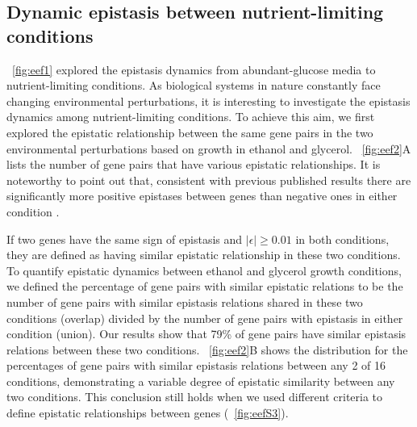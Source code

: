 \subsection{Dynamic epistasis between nutrient-limiting conditions}

\Fig~\ref{fig:eef1} explored the epistasis dynamics from abundant-glucose media
to nutrient-limiting conditions. As biological systems in nature
constantly face changing environmental perturbations, it is
interesting to investigate the epistasis dynamics among
nutrient-limiting conditions. To achieve this aim, we first explored
the epistatic relationship between the same gene pairs in the two
environmental perturbations based on growth in ethanol and
glycerol. \Fig~\ref{fig:eef2}A lists the number of gene pairs that have various
epistatic relationships. It is noteworthy to point out that,
consistent with previous published results there are significantly
more positive epistases between genes than negative ones in either
condition \citep{He2010}.


If two genes have the same sign of epistasis and
$\left|\epsilon\right| \geq 0.01$ in both conditions, they are defined
as having similar epistatic
relationship in these two conditions. To quantify epistatic dynamics
between ethanol and glycerol growth conditions, we defined the
percentage of gene pairs with similar epistatic relations to be the
number of gene pairs with similar epistasis relations shared in these
two conditions (overlap) divided by the number of gene pairs with
epistasis in either condition (union). Our results show that 79\% of
gene pairs have similar epistasis relations between these two
conditions. \Fig~\ref{fig:eef2}B shows the distribution for the percentages of
gene pairs with similar epistasis relations between any 2 of 16
conditions, demonstrating a variable degree of epistatic similarity
between any two conditions.  This conclusion still holds when we used
different criteria to define epistatic relationships between genes
(\Fig~\ref{fig:eefS3}).

